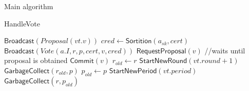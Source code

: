 \documentclass[10pt,a4paper]{article}
\begin{document}
\begin{section}{Main algorithm}
\begin{subsection}{HandleVote}
\begin{algorithm}[H]
\begin{algorithmic}[1]
                    \State $\mathsf{Broadcast}(Proposal(vt.v))$
                \EndIf
                        \State $cred \gets 
                        \mathsf{Sortition}(a_{sk}, cert)$
                            \State $\mathsf{Broadcast}(Vote(a.I, r, p, cert, v, cred))$
                        \EndIf
                    \EndFor
                \EndIf
                        \State $\mathsf{RequestProposal}(v)$ //waits until proposal is obtained
                    \EndIf
                    \State $\mathsf{Commit}(v)$  %
                    \State $r_{old} \gets r$
                    \State $\mathsf{StartNewRound}(vt.round+1)$
                    \State $\mathsf{GarbageCollect}(r_{old}, p)$
                \EndIf
                    \State $p_{old} \gets p$
                    \State $\mathsf{StartNewPeriod}(vt.period)$
                    \State $\mathsf{GarbageCollect}(r, p_{old})$
                \EndIf
            \EndIf

        \EndFunction
        \end{algorithmic}
        \caption{\underline{HandleVote}}
    \end{algorithm}
    

\end{subsection}
\end{section}
\end{document}
